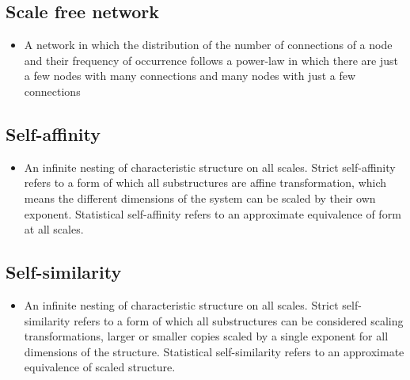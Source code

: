 \documentclass[12pt,]{book}
\providecommand{\tightlist}{%
  \setlength{\itemsep}{0pt}\setlength{\parskip}{0pt}}
\begin{document}
\hypertarget{Scal64}{%
\subsection*{\texorpdfstring{\textbf{Scale free network}}{Scale free network}}\label{Scal64}}

\begin{itemize}
\tightlist
\item
  A network in which the distribution of the number of connections of a node and their frequency of occurrence follows a power-law in which there are just a few nodes with many connections and many nodes with just a few connections
\end{itemize}

\hypertarget{Self65}{%
\subsection*{\texorpdfstring{\textbf{Self-affinity}}{Self-affinity}}\label{Self65}}

\begin{itemize}
\tightlist
\item
  An infinite nesting of characteristic structure on all scales. Strict self-affinity refers to a form of which all substructures are affine transformation, which means the different dimensions of the system can be scaled by their own exponent. Statistical self-affinity refers to an approximate equivalence of form at all scales.
\end{itemize}

\hypertarget{Self66}{%
\subsection*{\texorpdfstring{\textbf{Self-similarity}}{Self-similarity}}\label{Self66}}

\begin{itemize}
\tightlist
\item
  An infinite nesting of characteristic structure on all scales. Strict self-similarity refers to a form of which all substructures can be considered scaling transformations, larger or smaller copies scaled by a single exponent for all dimensions of the structure. Statistical self-similarity refers to an approximate equivalence of scaled structure.
\end{itemize}
\end{document}

